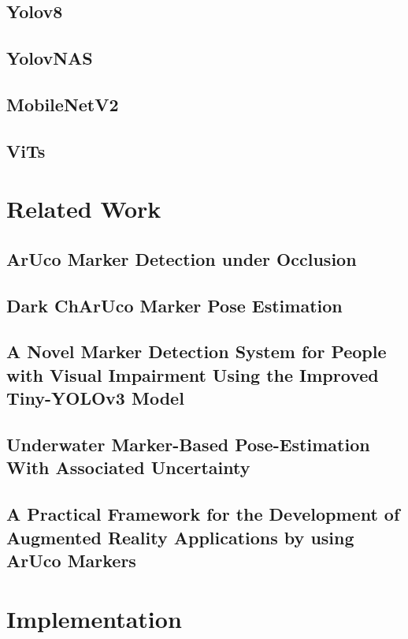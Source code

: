 \documentclass[10pt]{book}
\begin{document}
\section{Yolov8}

\section{YolovNAS}

\section{MobileNetV2}

\section{ViTs}

\chapter{Related Work}
\label{chap:relatedw}

\section{ArUco Marker Detection under Occlusion}

\section{Dark ChArUco Marker Pose Estimation}

\section{A Novel Marker Detection System for People with Visual Impairment Using the Improved Tiny-YOLOv3 Model}

\section{Underwater Marker-Based Pose-Estimation With Associated Uncertainty}

\section{A Practical Framework for the Development of Augmented Reality
Applications by using ArUco Markers}

\chapter{Implementation}
\label{chap:implement}
\end{document}
